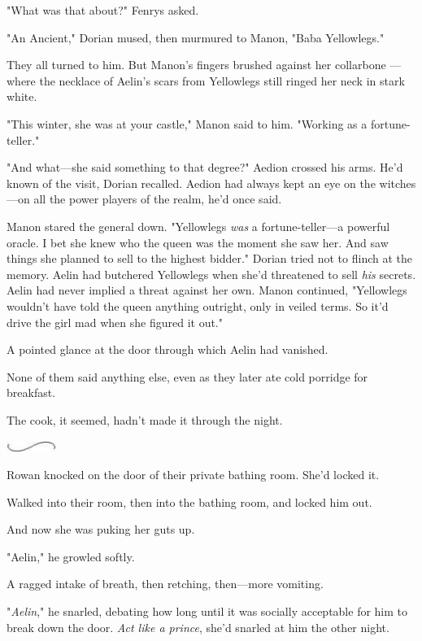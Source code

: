 "What was that about?"
Fenrys asked.

"An Ancient," Dorian mused, then murmured to Manon, "Baba Yellowlegs."

They all turned to him.
But Manon's fingers brushed against her collarbone ---where the necklace of Aelin's scars from Yellowlegs still ringed her neck in stark white.

"This winter, she was at your castle," Manon said to him.
"Working as a fortune-teller."

"And what---she said something to that degree?"
Aedion crossed his arms.
He'd known of the visit, Dorian recalled.
Aedion had always kept an eye on the witches---on all the power players of the realm, he'd once said.

Manon stared the general down.
"Yellowlegs \emph{was} a fortune-teller---a powerful oracle.
I bet she knew who the queen was the moment she saw her.
And saw things she planned to sell to the highest bidder."
Dorian tried not to flinch at the memory.
Aelin had butchered Yellowlegs when she'd threatened to sell \emph{his} secrets.
Aelin had never implied a threat against her own.
Manon continued, "Yellowlegs wouldn't have told the queen anything outright, only in veiled terms.
So it'd drive the girl mad when she figured it out."

A pointed glance at the door through which Aelin had vanished.

None of them said anything else, even as they later ate cold porridge for breakfast.

The cook, it seemed, hadn't made it through the night.

\begin{center}
	\includegraphics[width=0.65in,height=0.13in]{images/seperator}
\end{center}

Rowan knocked on the door of their private bathing room.
She'd locked it.

Walked into their room, then into the bathing room, and locked him out.

And now she was puking her guts up.

"Aelin," he growled softly.

A ragged intake of breath, then retching, then---more vomiting.

"\emph{Aelin}," he snarled, debating how long until it was socially acceptable for him to break down the door.
\emph{Act like a prince}, she'd snarled at him the other night.

